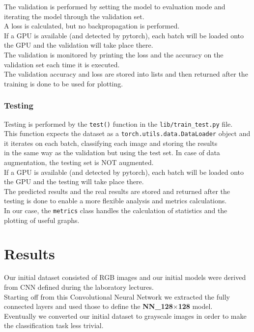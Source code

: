 \documentclass{report}
\begin{document}
The validation is performed by setting the model to evaluation mode and iterating the model through the validation set. \\
A loss is calculated, but no backpropagation is performed.\\
If a GPU is available (and detected by pytorch), each batch will be loaded onto the GPU and the validation will take place there. \\

The validation is monitored by printing the loss and the accuracy on the validation set each time it is executed. \\
The validation accuracy and loss are stored into lists and then returned after the training is done to be used for plotting. \\
\subsection{Testing}
Testing is performed by the \texttt{test()} function in the \texttt{lib/train\_test.py} file. \\
This function expects the dataset as a \texttt{torch.utils.data.DataLoader} object and it iterates on each batch, classifying each image and storing the results \\
in the same way as the validation but using the test set. In case of data augmentation, the testing set is NOT augmented.\\

If a GPU is available (and detected by pytorch), each batch will be loaded onto the GPU and the testing will take place there. \\

The predicted results and the real results are stored and returned after the testing is done to enable a more flexible analysis and metrics calculations.\\
In our case, the \texttt{metrics} class handles the calculation of statistics and the plotting of useful graphs.\\

\chapter{Results}
Our initial dataset consisted of RGB images and our initial models were derived from CNN defined during the laboratory lectures.\\
Starting off from this Convolutional Neural Network we extracted the fully connected
layers and used those to define the \textbf{NN\_128$\times$128} model.\\
Eventually we converted our initial dataset to grayscale images in order to make the classification task less trivial.\\
\end{document}
